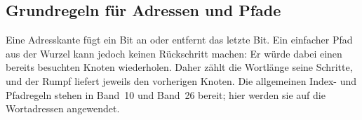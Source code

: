 \subsection{Grundregeln für Adressen und Pfade}

Eine Adresskante fügt ein Bit an oder entfernt das letzte Bit. Ein einfacher
Pfad aus der Wurzel kann jedoch keinen Rückschritt machen: Er würde dabei
einen bereits besuchten Knoten wiederholen. Daher zählt die Wortlänge seine
Schritte, und der Rumpf liefert jeweils den vorherigen Knoten. Die allgemeinen Index- und Pfadregeln stehen in Band~10 und Band~26
bereit; hier werden sie auf die Wortadressen angewendet.

\newcommand{\BXXVIIAddressRoot}{\EmptyWord{\{0,1\}}}
\newcommand{\BXXVIIAddressPath}[2]{\DirectedPath{P}{\AddressEdges P}{#1}{#2}}
\newcommand{\BXXVIIAddressForward}[2]{%
  \forall i\in\NatSeg{#2}\,\exists a\in\{0,1\}\,
  #1(i+1)=\WordConcat{#1(i)}{\LetterWord a}}

\begin{tabproofwide}
\end{tabproofwide}


